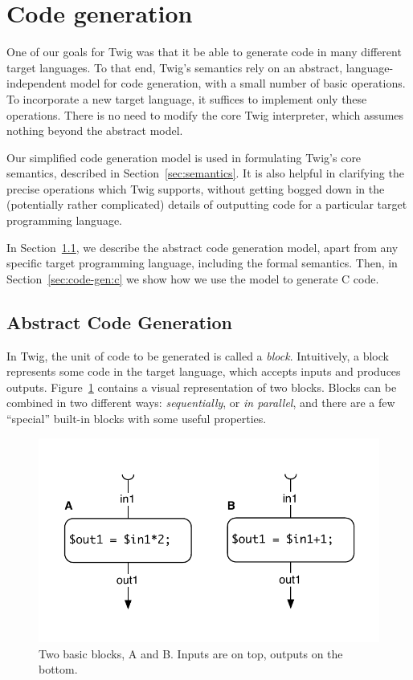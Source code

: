
\section{Code generation}
\label{sec:code-gen}

One of our goals for Twig was that it be able to generate code in many different target languages. To that end, Twig's semantics rely on an abstract, language-independent model for code generation, with a small number of basic operations. To incorporate a new target language, it suffices to implement only these operations. There is no need to modify the core Twig interpreter, which assumes nothing beyond the abstract model.

Our simplified code generation model is used in formulating Twig's core semantics, described in Section~\ref{sec:semantics}. It is also helpful in clarifying the precise operations which Twig supports, without getting bogged down in the (potentially rather complicated) details of outputting code for a particular target programming language.

In Section~\ref{sec:code-gen:abstract}, we describe the abstract code generation model, apart from any specific target programming language, including the formal semantics. Then, in Section~\ref{sec:code-gen:c} we show how we use the model to generate C code.

\subsection{Abstract Code Generation}
\label{sec:code-gen:abstract}

In Twig, the unit of code to be generated is called a \emph{block}. Intuitively, a block represents some code in the target language, which accepts inputs and produces outputs. Figure~\ref{fig:blocks} contains a visual representation of two blocks. Blocks can be combined in two different ways: \emph{sequentially}, or \emph{in parallel}, and there are a few ``special'' built-in blocks with some useful properties.

\begin{figure}[ht]
\centering
\includegraphics[width=0.75\columnwidth]{images/code-gen1}
\caption{Two basic blocks, A and B. Inputs are on top, outputs on the bottom.}
\label{fig:blocks}
\end{figure}

